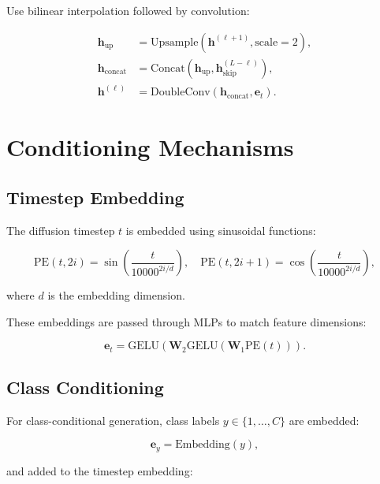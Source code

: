 \documentclass[12pt]{report}
\theoremstyle{definition}
\begin{document}
Use bilinear interpolation followed by convolution:

\begin{align}
\mathbf{h}_{\text{up}} &= \text{Upsample}(\mathbf{h}^{(\ell+1)}, \text{scale}=2), \label{eq:upsample} \\
\mathbf{h}_{\text{concat}} &= \text{Concat}(\mathbf{h}_{\text{up}}, \mathbf{h}_{\text{skip}}^{(L-\ell)}), \label{eq:concat_skip} \\
\mathbf{h}^{(\ell)} &= \text{DoubleConv}(\mathbf{h}_{\text{concat}}, \mathbf{e}_t). \label{eq:up_conv}
\end{align}

\section{Conditioning Mechanisms}

\subsection{Timestep Embedding}

The diffusion timestep $t$ is embedded using sinusoidal functions:

\begin{equation}
\text{PE}(t, 2i) = \sin\left(\frac{t}{10000^{2i/d}}\right), \quad \text{PE}(t, 2i+1) = \cos\left(\frac{t}{10000^{2i/d}}\right),
\label{eq:timestep_embed}
\end{equation}

where $d$ is the embedding dimension.

These embeddings are passed through MLPs to match feature dimensions:

\begin{equation}
\mathbf{e}_t = \text{GELU}(\mathbf{W}_2 \text{GELU}(\mathbf{W}_1 \text{PE}(t))).
\label{eq:time_mlp}
\end{equation}

\subsection{Class Conditioning}

For class-conditional generation, class labels $y \in \{1, \ldots, C\}$ are embedded:

\begin{equation}
\mathbf{e}_y = \text{Embedding}(y),
\label{eq:class_embed}
\end{equation}

and added to the timestep embedding:
\end{document}
